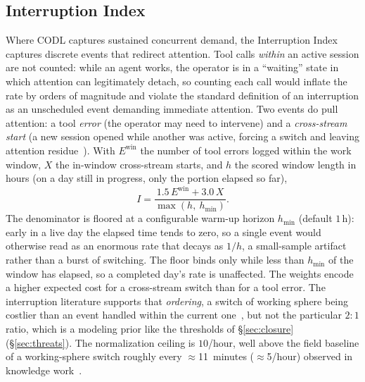 \documentclass[10pt,twocolumn]{article}
\begin{document}
\subsection{Interruption Index}\label{sec:interruption}
Where CODL captures sustained concurrent demand, the Interruption Index captures
discrete events that redirect attention.
Tool calls \emph{within} an active session are not counted: while an agent
works, the operator is in a ``waiting'' state in which attention can legitimately
detach, so counting each call would inflate the rate by orders of magnitude and
violate the standard definition of an interruption as an unscheduled event
demanding immediate attention. Two events do pull attention: a tool
\emph{error} (the operator may need to intervene) and a \emph{cross-stream
start} (a new session opened while another was active, forcing a switch and leaving
attention residue~\cite{leroy2009}). With $E^{\mathrm{win}}$ the number of tool
errors logged within the work window, $X$ the in-window cross-stream starts,
and $h$ the scored window length in hours (on a day still in progress, only
the portion elapsed so far),
\begin{equation}
I = \frac{1.5\,E^{\mathrm{win}} + 3.0\,X}{\max(h,\ h_{\min})}.
\end{equation}
The denominator is floored at a configurable warm-up horizon $h_{\min}$
(default $1$\,h): early in a live day the elapsed time tends to zero, so a
single event would otherwise read as an enormous rate that decays as $1/h$, a
small-sample artifact rather than a burst of switching. The floor binds only
while less than $h_{\min}$ of the window has elapsed, so a completed day's
rate is unaffected.
The weights encode a higher expected cost for a cross-stream switch than for
a tool error. The interruption literature supports that \emph{ordering}, a
switch of working sphere being costlier than an event handled within the
current one~\cite{mark2008,mark2005,wickens2008}, but not the particular
$2{:}1$ ratio, which is a modeling prior like the thresholds of
\S\ref{sec:closure} (\S\ref{sec:threats}). The normalization
ceiling is $10$/hour, well above the field baseline of a working-sphere switch
roughly every $\approx$11~minutes ($\approx$5/hour) observed in knowledge
work~\cite{gonzalezmark2004}.
\end{document}
